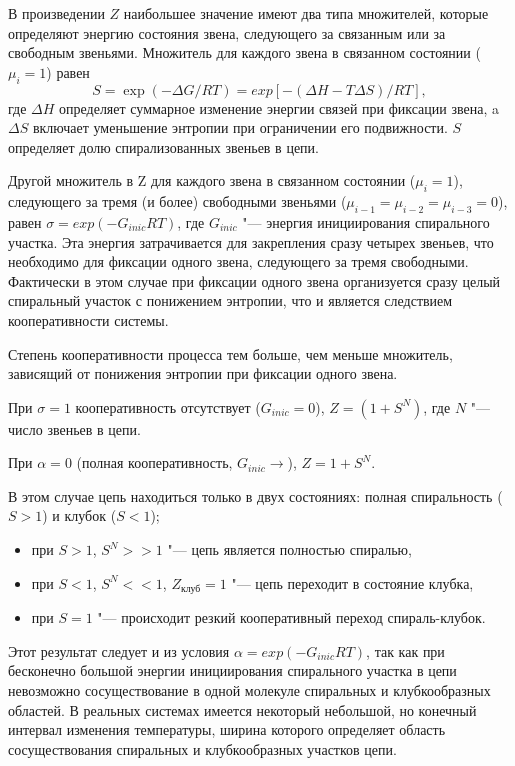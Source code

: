 \documentclass[12pt,a4paper,oneside]{book}
\begin{document}
В произведении $Z$ наибольшее значение имеют два типа множителей, которые определяют энергию состояния звена, следующего за связанным или за свободным звеньями. Множитель для каждого звена в связанном состоянии ($\mu_i=1$) равен
\begin{equation}
	S = \exp( - \Delta G/RT ) = exp [ - ( \Delta H - T \Delta S )/RT ] ,
\end{equation}
где $\Delta H$ определяет суммарное изменение энергии связей при фиксации звена, a $\Delta S$ включает уменьшение энтропии при ограничении его подвижности. $S$ определяет долю спирализованных звеньев в цепи.

Другой множитель в Z для каждого звена в связанном состоянии ($\mu_i=1$), следующего за тремя (и более) свободными звеньями ($\mu_{i-1}=\mu_{i-2}=\mu_{i-3}=0$), равен $\sigma = exp( -G_{inic} RT)$, где $G_{inic}$ "--- энергия инициирования спирального участка. Эта энергия затрачивается для закрепления сразу четырех звеньев, что необходимо для фиксации одного звена, следующего за тремя свободными. Фактически в этом случае при фиксации одного звена организуется сразу целый спиральный участок с понижением энтропии, что и является следствием кооперативности системы.

Степень кооперативности процесса тем больше, чем меньше множитель, зависящий от понижения энтропии при фиксации одного звена.

При $\sigma = 1$ кооперативность отсутствует ($G_{inic} = 0$),
$Z = (1 + S^N)$, где $N$ "--- число звеньев в цепи.

При $ \alpha= 0$ (полная кооперативность, $G_{inic} \rightarrow $), $Z = 1+ S^N$.

В этом случае цепь находиться только в двух состояниях: полная спиральность ($S>1$) и клубок ($S<1$);
\begin{itemize}
\item при $S > 1$, $S^N>>1$ "--- цепь является полностью спиралью,
\item при $S<1$, $S^N<<1$, $Z_\text{клуб}=1$ "--- цепь переходит в состояние клубка,
\item при $S = 1$ "--- происходит резкий кооперативный переход спираль-клубок.
\end{itemize}

Этот результат следует и из условия $\alpha = exp(-G_{inic} RT )$, так как при бесконечно большой энергии инициирования спирального участка в цепи невозможно сосуществование в одной молекуле спиральных и клубкообразных областей. В реальных системах имеется некоторый небольшой, но конечный интервал изменения температуры, ширина которого определяет область сосуществования спиральных и клубкообразных участков цепи.
\end{document}
